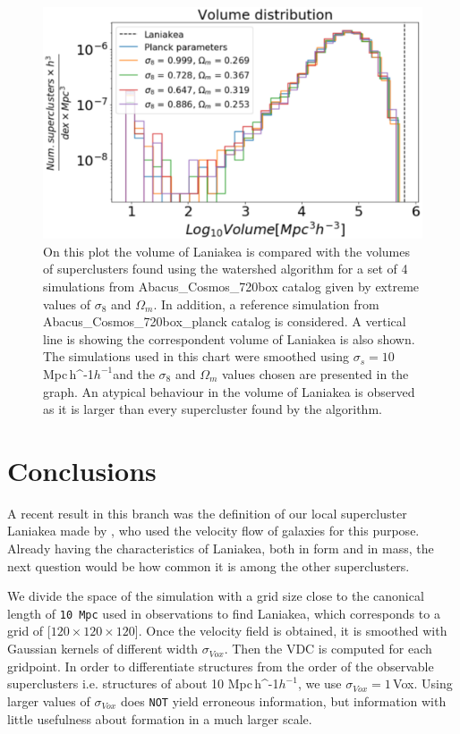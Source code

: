 \documentclass[usenatbib]{mnras}
\newcommand{\Mpch}{\,{\rm Mpc}\,\ifmmode h^{-1}\else $h^{-1}$\fi}
\begin{document}
\begin{figure}
    \centering
    \includegraphics[width=345pt]{vol_different_simulations.pdf}
    \caption{On this plot the volume of Laniakea is compared with the
      volumes of superclusters found using the watershed algorithm for
      a set of 4 simulations from Abacus\_Cosmos\_720box catalog given
      by extreme values of $\sigma_8$ and $\Omega_m$. In addition, a
      reference simulation from Abacus\_Cosmos\_720box\_planck catalog
      is considered. A vertical line is showing the correspondent
      volume of Laniakea is also shown. The simulations used in this
      chart were smoothed using $\sigma_s = 10$\,\Mpch and the
      $\sigma_8$ and $\Omega_m$ values chosen are presented in the
      graph. An atypical behaviour in the volume of Laniakea is
      observed as it is larger than every supercluster found by the
      algorithm.}  
    \label{fig:diferentes}
\end{figure}




\section{Conclusions}
\label{sec:conclusions}

A recent result in this branch was the definition of our local supercluster Laniakea made by \cite{2014Natur.513...71T}, who used the velocity flow of galaxies for this purpose. Already having the characteristics of Laniakea, both in form and in mass, the next question would be how common it is among the other superclusters.

We divide the space of the simulation with a grid size close to the
canonical length of \texttt{10\,Mpc} used in observations to find
Laniakea, which corresponds to a grid of [$120 \times 120 \times
  120$]. Once the velocity field is obtained, it is smoothed with
Gaussian kernels of different width $\sigma_{Vox}$. Then the VDC is
computed for each gridpoint. In order to differentiate structures from
the order of the observable superclusters i.e. structures of about
10\,\Mpch, we use $\sigma_{Vox} = 1$\,Vox. Using larger values of
$\sigma_{Vox}$ does \texttt{NOT} yield erroneous information, but
information with little usefulness about formation in a much larger
scale.   
\end{document}
